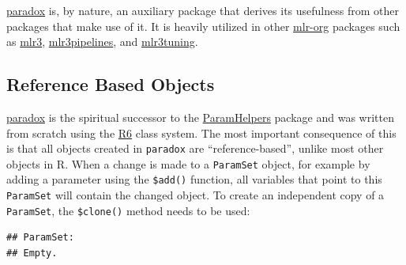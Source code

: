 \documentclass[]{scrbook}
\newenvironment{Shaded}{\begin{snugshade}}{\end{snugshade}}
\newcommand{\CommentTok}[1]{\textcolor[rgb]{0.56,0.35,0.01}{\textit{#1}}}
\newcommand{\DataTypeTok}[1]{\textcolor[rgb]{0.13,0.29,0.53}{#1}}
\newcommand{\KeywordTok}[1]{\textcolor[rgb]{0.13,0.29,0.53}{\textbf{#1}}}
\newcommand{\NormalTok}[1]{#1}
\newcommand{\OperatorTok}[1]{\textcolor[rgb]{0.81,0.36,0.00}{\textbf{#1}}}
\newcommand{\OtherTok}[1]{\textcolor[rgb]{0.56,0.35,0.01}{#1}}
\newcommand{\StringTok}[1]{\textcolor[rgb]{0.31,0.60,0.02}{#1}}
\renewenvironment{Shaded} {\begin{snugshade}\small} {\end{snugshade}}
\begin{document}
\href{https://paradox.mlr-org.com}{paradox} is, by nature, an auxiliary package that derives its usefulness from other packages that make use of it.
It is heavily utilized in other \href{https://github.com/mlr-org}{mlr-org} packages such as \href{https://mlr3.mlr-org.com}{mlr3}, \href{https://mlr3pipelines.mlr-org.com}{mlr3pipelines}, and \href{https://mlr3tuning.mlr-org.com}{mlr3tuning}.

\hypertarget{reference-based-objects}{%
\subsection{Reference Based Objects}\label{reference-based-objects}}

\href{https://paradox.mlr-org.com}{paradox} is the spiritual successor to the \href{https://cran.r-project.org/package=ParamHelpers}{ParamHelpers} package and was written from scratch using the \href{https://cran.r-project.org/package=R6}{R6} class system.
The most important consequence of this is that all objects created in \texttt{paradox} are ``reference-based'', unlike most other objects in R.
When a change is made to a \texttt{ParamSet} object, for example by adding a parameter using the \texttt{\$add()} function, all variables that point to this \texttt{ParamSet} will contain the changed object.
To create an independent copy of a \texttt{ParamSet}, the \texttt{\$clone()} method needs to be used:

\begin{Shaded}
\end{Shaded}

\begin{verbatim}
## ParamSet: 
## Empty.
\end{verbatim}

\begin{Shaded}
\end{Shaded}
\end{document}
